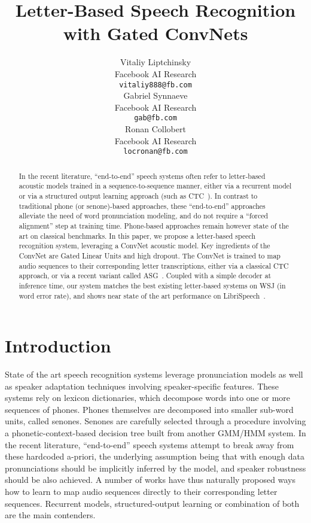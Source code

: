 \documentclass{article}
\title{Letter-Based Speech Recognition\\
with Gated ConvNets}
\author{
  Vitaliy Liptchinsky\\
  Facebook AI Research\\
  \texttt{vitaliy888@fb.com} \\
  \And
  Gabriel Synnaeve\\
  Facebook AI Research\\
  \texttt{gab@fb.com}\\
  \And
  Ronan Collobert\\
  Facebook AI Research\\
  \texttt{locronan@fb.com}\\
}
\begin{document}
\maketitle

\begin{abstract}
  In the recent literature, ``end-to-end'' speech systems often refer to
  letter-based acoustic models trained in a sequence-to-sequence manner,
  either via a recurrent model or via a structured output learning approach
  (such as CTC~\citep{graves2006connectionist}). In contrast to traditional
  phone (or senone)-based approaches, these ``end-to-end'' approaches
  alleviate the need of word pronunciation modeling, and do not require a
  ``forced alignment'' step at training time. Phone-based approaches remain
  however state of the art on classical benchmarks. In this paper, we
  propose a letter-based speech recognition system, leveraging a ConvNet
  acoustic model. Key ingredients of the ConvNet are Gated Linear Units and
  high dropout. The ConvNet is trained to map audio sequences to their
  corresponding letter transcriptions, either via a classical CTC approach,
  or via a recent variant called ASG~\citep{collobert2016wav2letter}. Coupled
  with a simple decoder at inference time, our system matches the best existing
  letter-based systems on WSJ (in word error rate), and shows near
  state of the art performance on LibriSpeech~\citep{panayotov2015librispeech}.

\end{abstract}

\section{Introduction}

State of the art speech recognition systems leverage pronunciation
models as well as speaker adaptation techniques involving speaker-specific
features. These systems rely on lexicon dictionaries, which decompose
words into one or more sequences of phones. Phones themselves are
decomposed into smaller sub-word units, called senones. Senones are
carefully selected through a procedure involving a phonetic-context-based
decision tree built from another GMM/HMM system. In the recent literature,
``end-to-end'' speech systems attempt to break away from these hardcoded
a-priori, the underlying assumption being that with enough data
pronunciations should be implicitly inferred by the model, and speaker
robustness should be also achieved. A number of works have thus naturally
proposed ways how to learn to map audio sequences directly to their
corresponding letter sequences. Recurrent models,
structured-output learning or combination of both are the main contenders.
\end{document}
